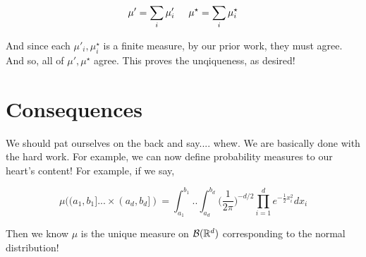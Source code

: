 \[ \mu' = \sum_i \mu'_i \hspace{0.5cm} \mu^\star = \sum_i \mu^\star_i \]

And since each $\mu'_i, \mu^\star_i$ is a finite measure, by our prior work, they must agree. 
And so, all of $\mu', \mu^\star$ agree. This proves the unqiqueness, as desired!

\section{Consequences}

We should pat ourselves on the back and say.... whew. We are basically done with the hard work. 
For example, we can now define probability measures to our heart's content! For example, if we say, 

\[ \mu((a_1, b_1] ... \times (a_d, b_d]) =  \int_{a_1}^{b_1}.. \int_{a_d}^{b_d}\bigg(\frac{1}{2\pi}\bigg)^{-d/2} \prod_{i=1}^d e^{-\frac{1}{2}x_i^2}dx_i \]

Then we know $\mu$ is the unique measure on $\mathcal B(\mathbb R^d)$ corresponding to the normal distribution!